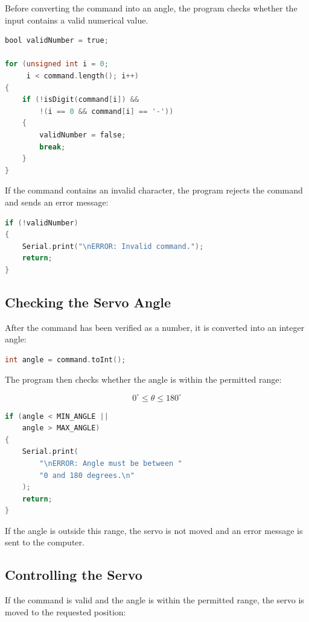 \documentclass[12pt,a4paper]{article}
\begin{document}
Before converting the command into an angle, the program checks
whether the input contains a valid numerical value.

\begin{lstlisting}[language=C]
bool validNumber = true;

for (unsigned int i = 0;
     i < command.length(); i++)
{
    if (!isDigit(command[i]) &&
        !(i == 0 && command[i] == '-'))
    {
        validNumber = false;
        break;
    }
}
\end{lstlisting}

If the command contains an invalid character, the program rejects the
command and sends an error message:

\begin{lstlisting}[language=C]
if (!validNumber)
{
    Serial.print("\nERROR: Invalid command.");
    return;
}
\end{lstlisting}

\subsection{Checking the Servo Angle}

After the command has been verified as a number, it is converted into
an integer angle:

\begin{lstlisting}[language=C]
int angle = command.toInt();
\end{lstlisting}

The program then checks whether the angle is within the permitted
range:

\[
0^\circ \leq \theta \leq 180^\circ
\]

\begin{lstlisting}[language=C]
if (angle < MIN_ANGLE ||
    angle > MAX_ANGLE)
{
    Serial.print(
        "\nERROR: Angle must be between "
        "0 and 180 degrees.\n"
    );
    return;
}
\end{lstlisting}

If the angle is outside this range, the servo is not moved and an error
message is sent to the computer.

\subsection{Controlling the Servo}

If the command is valid and the angle is within the permitted range,
the servo is moved to the requested position:
\end{document}
